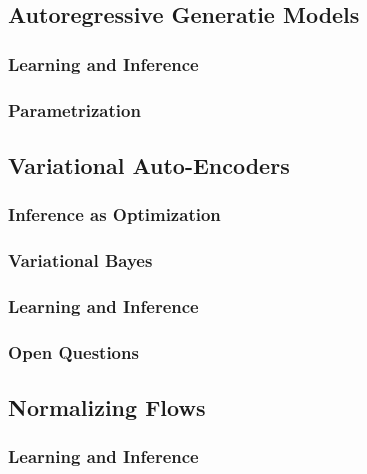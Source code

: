 		\subsection{Autoregressive Generatie Models} %

			\subsubsection{Learning and Inference} %

			\subsubsection{Parametrization} %

		\subsection{Variational Auto-Encoders} %

			\subsubsection{Inference as Optimization} %

			\subsubsection{Variational Bayes} %

			\subsubsection{Learning and Inference} %

			\subsubsection{Open Questions} %

		\subsection{Normalizing Flows} %

			\subsubsection{Learning and Inference} %

